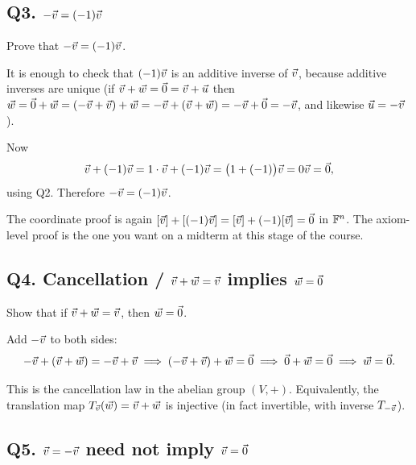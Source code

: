 \subsection{Q3. $-\vec{v}=(-1)\vec{v}$}

\begin{promptbox}
Prove that $-\vec{v}=(-1)\vec{v}$.
\end{promptbox}

\begin{coursebox}
It is enough to check that $(-1)\vec{v}$ is an additive inverse of $\vec{v}$, because
additive inverses are unique (if $\vec{v}+\vec{w}=\vec{0}=\vec{v}+\vec{u}$ then
$\vec{w}=\vec{0}+\vec{w}=(-\vec{v}+\vec{v})+\vec{w}=-\vec{v}+(\vec{v}+\vec{w})=-\vec{v}+\vec{0}=-\vec{v}$, and likewise
$\vec{u}=-\vec{v}$).

Now
\[
\vec{v}+(-1)\vec{v}=1\cdot\vec{v}+(-1)\vec{v}=\bigl(1+(-1)\bigr)\vec{v}=0\vec{v}=\vec{0},
\]
using Q2. Therefore $-\vec{v}=(-1)\vec{v}$.
\end{coursebox}

\begin{laterbox}
The coordinate proof is again $[\vec{v}]+[(-1)\vec{v}]=[\vec{v}]+(-1)[\vec{v}]=\vec{0}$ in $\mathbb{F}^n$.
The axiom-level proof is the one you want on a midterm at this stage of the
course.
\end{laterbox}

\subsection{Q4. Cancellation / $\vec{v}+\vec{w}=\vec{v}$ implies $\vec{w}=\vec{0}$}

\begin{promptbox}
Show that if $\vec{v}+\vec{w}=\vec{v}$, then $\vec{w}=\vec{0}$.
\end{promptbox}

\begin{coursebox}
Add $-\vec{v}$ to both sides:
\[
-\vec{v}+(\vec{v}+\vec{w})=-\vec{v}+\vec{v}
\implies
(-\vec{v}+\vec{v})+\vec{w}=\vec{0}
\implies
\vec{0}+\vec{w}=\vec{0}
\implies
\vec{w}=\vec{0}.
\]
\end{coursebox}

\begin{laterbox}
This is the cancellation law in the abelian group $(V,+)$. Equivalently,
the translation map $T_{\vec{v}}(\vec{w})=\vec{v}+\vec{w}$ is injective (in fact invertible,
with inverse $T_{-\vec{v}}$).
\end{laterbox}

\subsection{Q5. $\vec{v}=-\vec{v}$ need not imply $\vec{v}=\vec{0}$}


